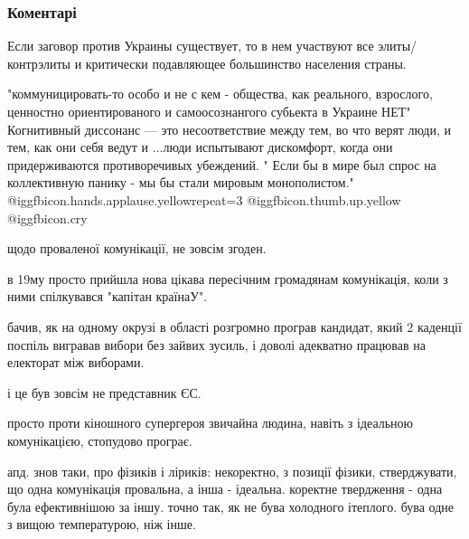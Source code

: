 
 
 
 
 
\subsubsection{Коментарі}

\begin{itemize} %

Если заговор против Украины существует, то в нем участвуют все элиты/контрэлиты
и критически подавляющее большинство населения страны.



"коммуницировать-то особо и не с кем - общества, как реального, взрослого,
ценностно ориентированого и самоосознангого субьекта в Украине НЕТ" Когнитивный
диссонанс — это несоответствие между тем, во что верят люди, и тем, как они
себя ведут и ...люди испытывают дискомфорт, когда они придерживаются
противоречивых убеждений. " Если бы в мире был спрос на коллективную панику -
мы бы стали мировым монополистом." @igg{fbicon.hands.applause.yellow}{repeat=3}  @igg{fbicon.thumb.up.yellow}  @igg{fbicon.cry} 


щодо проваленої комунікації, не зовсім згоден.

в 19му просто прийшла нова цікава пересічним громадянам комунікація, коли з
ними спілкувався "капітан країнаУ".

бачив, як на одному окрузі в області розгромно програв кандидат, який 2
каденції поспіль вигравав вибори без зайвих зусиль, і доволі адекватно працював
на електорат між виборами.

і це був зовсім не представник ЄС.

просто проти кіношного супергероя звичайна людина, навіть з ідеальною
комунікацією, стопудово програє.

апд. знов таки, про фізиків і ліриків: некоректно, з позиції фізики,
стверджувати, що одна комунікація провальна, а інша - ідеальна. коректне
твердження - одна була ефективнішою за іншу. точно так, як не бува холодного
ітеплого. бува одне з вищою температурою, ніж інше.


\end{itemize}
